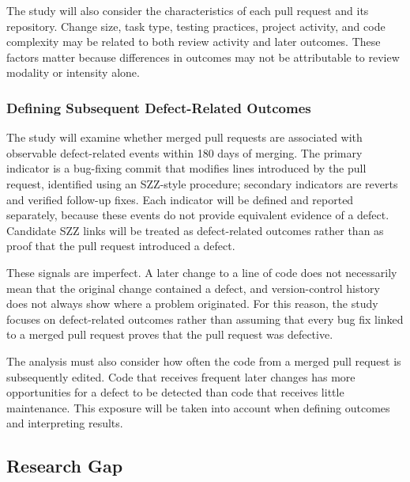 \documentclass[stu,12pt,donotrepeattitle]{apa7}
\begin{document}
The study will also consider the characteristics of each pull request and its repository. Change size, task type, testing practices, project activity, and code complexity may be related to both review activity and later outcomes. These factors matter because differences in outcomes may not be attributable to review modality or intensity alone.

\subsubsection{Defining Subsequent Defect-Related Outcomes}

The study will examine whether merged pull requests are associated with observable defect-related events within 180 days of merging. The primary indicator is a bug-fixing commit that modifies lines introduced by the pull request, identified using an SZZ-style procedure; secondary indicators are reverts and verified follow-up fixes. Each indicator will be defined and reported separately, because these events do not provide equivalent evidence of a defect. Candidate SZZ links will be treated as defect-related outcomes rather than as proof that the pull request introduced a defect.

These signals are imperfect. A later change to a line of code does not necessarily mean that the original change contained a defect, and version-control history does not always show where a problem originated. For this reason, the study focuses on defect-related outcomes rather than assuming that every bug fix linked to a merged pull request proves that the pull request was defective.

The analysis must also consider how often the code from a merged pull request is subsequently edited. Code that receives frequent later changes has more opportunities for a defect to be detected than code that receives little maintenance. This exposure will be taken into account when defining outcomes and interpreting results.

\subsection{Research Gap}
\end{document}
